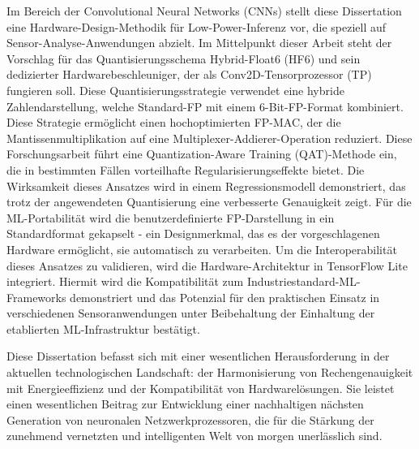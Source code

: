\documentclass{article}
\begin{document}
Im Bereich der Convolutional Neural Networks (CNNs) stellt diese Dissertation eine Hardware-Design-Methodik f\"ur Low-Power-Inferenz vor, die speziell auf Sensor-Analyse-Anwendungen abzielt. Im Mittelpunkt dieser Arbeit steht der Vorschlag f\"ur das Quantisierungsschema Hybrid-Float6 (HF6) und sein dedizierter Hardwarebeschleuniger, der als Conv2D-Tensorprozessor (TP) fungieren soll. Diese Quantisierungsstrategie verwendet eine hybride Zahlendarstellung, welche Standard-FP mit einem 6-Bit-FP-Format kombiniert. Diese Strategie erm\"oglicht einen hochoptimierten FP-MAC, der die Mantissenmultiplikation auf eine Multiplexer-Addierer-Operation reduziert. Diese Forschungsarbeit f\"uhrt eine Quantization-Aware Training (QAT)-Methode ein, die in bestimmten F\"allen vorteilhafte Regularisierungseffekte bietet. Die Wirksamkeit dieses Ansatzes wird in einem Regressionsmodell demonstriert, das trotz der angewendeten Quantisierung eine verbesserte Genauigkeit zeigt. F\"ur die ML-Portabilit\"at wird die benutzerdefinierte FP-Darstellung in ein Standardformat gekapselt - ein Designmerkmal, das es der vorgeschlagenen Hardware erm\"oglicht, sie automatisch zu verarbeiten. Um die Interoperabilit\"at dieses Ansatzes zu validieren, wird die Hardware-Architektur in TensorFlow Lite integriert. Hiermit wird die Kompatibilit\"at zum Industriestandard-ML-Frameworks demonstriert und das Potenzial f\"ur den praktischen Einsatz in verschiedenen Sensoranwendungen unter Beibehaltung der Einhaltung der etablierten ML-Infrastruktur best\"atigt.

Diese Dissertation befasst sich mit einer wesentlichen Herausforderung in der aktuellen technologischen Landschaft: der Harmonisierung von Rechengenauigkeit mit Energieeffizienz und der Kompatibilit\"at von Hardwarel\"osungen. Sie leistet einen wesentlichen Beitrag zur Entwicklung einer nachhaltigen n\"achsten Generation von neuronalen Netzwerkprozessoren, die f\"ur die St\"arkung der zunehmend vernetzten und intelligenten Welt von morgen unerl\"asslich sind.
\end{document}
